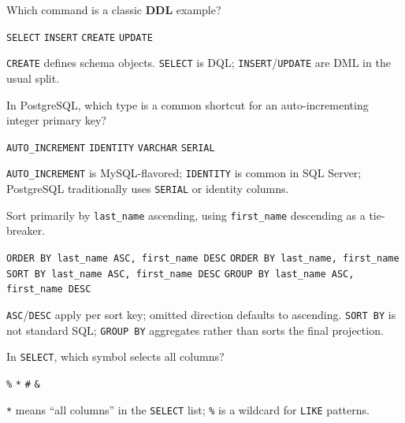 \question[4]
Which command is a classic \textbf{DDL} example?
\begin{choices}
  \choice \texttt{SELECT}
  \choice \texttt{INSERT}
  \CorrectChoice \texttt{CREATE}
  \choice \texttt{UPDATE}
\end{choices}
\begin{solution}
  \texttt{CREATE} defines schema objects. \texttt{SELECT} is DQL; \texttt{INSERT}/\texttt{UPDATE} are DML in the usual split.
\end{solution}

\question[4]
In PostgreSQL, which type is a common shortcut for an auto-incrementing integer primary key?
\begin{choices}
  \choice \texttt{AUTO\_INCREMENT}
  \choice \texttt{IDENTITY}
  \choice \texttt{VARCHAR}
  \CorrectChoice \texttt{SERIAL}
\end{choices}
\begin{solution}
  \texttt{AUTO\_INCREMENT} is MySQL-flavored; \texttt{IDENTITY} is common in SQL Server; PostgreSQL traditionally uses \texttt{SERIAL} or identity columns.
\end{solution}

\question[4]
Sort primarily by \texttt{last\_name} ascending, using \texttt{first\_name} descending as a tie-breaker.
\begin{choices}
  \CorrectChoice \lstinline[style=sqlinline]!ORDER BY last_name ASC, first_name DESC!
  \choice \lstinline[style=sqlinline]!ORDER BY last_name, first_name!
  \choice \lstinline[style=sqlinline]!SORT BY last_name ASC, first_name DESC!
  \choice \lstinline[style=sqlinline]!GROUP BY last_name ASC, first_name DESC!
\end{choices}
\begin{solution}
  \texttt{ASC}/\texttt{DESC} apply per sort key; omitted direction defaults to ascending. \texttt{SORT BY} is not standard SQL; \texttt{GROUP BY} aggregates rather than sorts the final projection.
\end{solution}

\question[4]
In \texttt{SELECT}, which symbol selects all columns?
\begin{choices}
  \choice \texttt{\%}
  \CorrectChoice \texttt{*}
  \choice \texttt{\#}
  \choice \texttt{\&}
\end{choices}
\begin{solution}
  \texttt{*} means ``all columns'' in the \texttt{SELECT} list; \texttt{\%} is a wildcard for \texttt{LIKE} patterns.
\end{solution}

